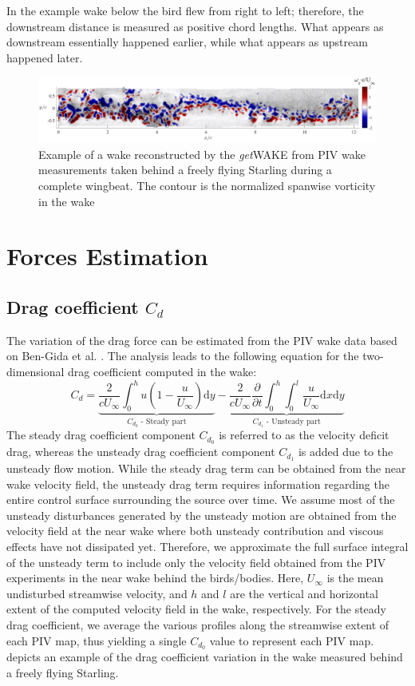 \documentclass[12pt,a4paper]{article}
\begin{document}
In the example wake below the bird flew from right to left; therefore, the downstream distance is measured as positive chord lengths. What appears as downstream essentially happened earlier, while what appears as upstream happened later. 
\begin{figure}[ht!]
	\centering
	\includegraphics[width=\textwidth]{wake-evolution-example}
	\caption{Example of a wake reconstructed by the \textit{get}WAKE from PIV wake measurements taken behind a freely flying Starling during a complete wingbeat. The contour is the normalized spanwise vorticity in the wake}
	\label{fig:GUI-wake-evolution-example}
\end{figure}


\section{Forces Estimation}\label{forces}
\subsection{Drag coefficient $C_d$}\label{Cd_calc}
The variation of the drag force can be estimated from the PIV wake data based on Ben-Gida et al. \cite{Ben-Gida2013}. 
The analysis leads to the following equation for the two-dimensional drag coefficient computed in the wake:
\begin{equation}
C_d = \underbrace{\frac{2}{cU_\infty}\int_0^h u\left(1 - \frac{u}{U_\infty}\right) \mathrm{d}y}_{C_{d_0}\text{ - Steady part}} - \underbrace{ \frac{2}{cU_\infty}\frac{\partial}{\partial t}\int_0^h \int_0^l \frac{u}{U_\infty} \mathrm{d}x\mathrm{d}y}_{C_{d_1}\text{ - Unsteady part}}
\label{eq:Cd}
\end{equation}
The steady drag coefficient component $C_{d_0}$ is referred to as the velocity deficit drag, whereas the unsteady drag coefficient component $C_{d_1}$ is added due to the unsteady flow motion.
While the steady drag term can be obtained from the near wake velocity field, the unsteady drag term requires information regarding the entire control surface surrounding the source over time. 
We assume most of the unsteady disturbances generated by the unsteady motion are obtained from the velocity field at the near wake where both unsteady contribution and viscous effects have not dissipated yet.
Therefore, we approximate the full surface integral of the unsteady term to include only the velocity field obtained from the PIV experiments in the near wake behind the birds/bodies. Here, $U_\infty$ is the mean undisturbed streamwise velocity, and $h$ and $l$ are the vertical and horizontal extent of the computed velocity field in the wake, respectively.
For the steady drag coefficient, we average the various profiles along the streamwise extent of each PIV map, thus yielding a single $C_{d_0}$ value to represent each PIV map. 
 depicts an example of the drag coefficient variation in the wake measured behind a freely flying Starling.
\end{document}
